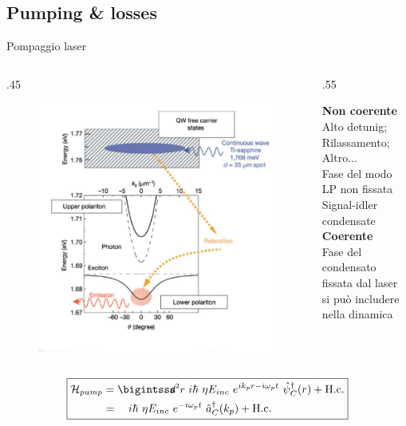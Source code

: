 \documentclass[10pt]{beamer}
\begin{document}
\subsection{Pumping \& losses}

\begin{frame}{Pompaggio laser}
  \begin{columns}
 \begin{column}
  {.45\textwidth}
    \begin{figure}[t]
    \flushleft
     \includegraphics[scale=.18]{files/incoherent.png}
    \end{figure}

 \end{column}
 
 \begin{column}
  {.55\textwidth}

     \textbf{Non coerente}\\
     Alto detunig; Rilassamento; Altro...\\
     Fase del modo LP non fissata\\
     Signal-idler condensate
     \vskip15pt
     \textbf{Coerente}\\
     Fase del condensato fissata dal laser\\
     si può includere nella dinamica
  
 \end{column}
\end{columns}

 \begin{equation*}
 \boxed{
    \begin{align*}
       \ham_{pump} &=\intr i\hbar \ \eta E_{inc} \ e^{ik_p r -i\omega_p t} \ \opsi_C^\dagger (r) +\hc \\
	&= \quad i\hbar \ \eta E_{inc} \ e^{-i\omega_p t} \ \oa_C^\dagger (k_p) +\hc
    \end{align*}
    }
 \end{equation*}
\end{frame}
\end{document}
